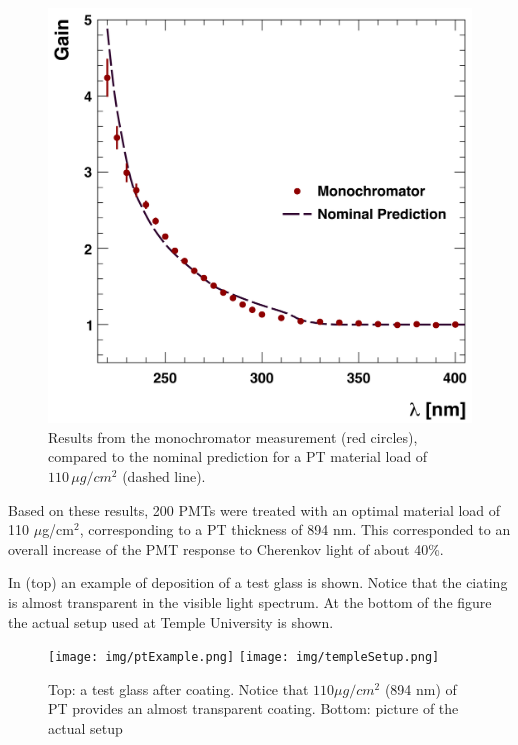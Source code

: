 \begin{figure}
	\centering
	\includegraphics[width=0.95\columnwidth,keepaspectratio]{img/ptQEResults.png}
	\caption{Results from the monochromator measurement (red circles), compared to the
				nominal prediction for a PT material load of
            $110\,\mu g/cm^2$ (dashed line).}
	\label{fig:ptQEResults}
\end{figure}

Based on these results, 200 PMTs were treated \cite{Joosten:2016lcl} with an optimal material load of 110 $\mu$g/cm$^2$,
corresponding to a PT thickness of 894 nm. This corresponded to an overall
increase of the PMT response to Cherenkov light of about 40\%.

In  (top) an example of deposition of a test glass is shown. Notice that the ciating is almost
transparent in the visible light spectrum. At the bottom of the figure the actual setup used at Temple
University is shown.

\begin{figure}
	\centering
	\texttt{[image: img/ptExample.png]}
	\texttt{[image: img/templeSetup.png]}
	\caption{Top: a test glass after coating. Notice that  $110 \mu g/ cm^2$ (894 nm) of PT provides an
            almost transparent coating. Bottom: picture of the actual setup}
	\label{fig:ptExample}
\end{figure}




